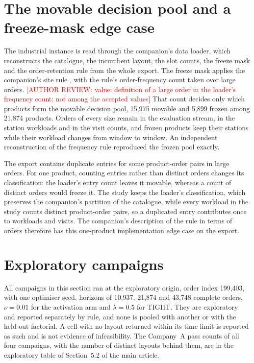 \documentclass[11pt]{article}
\newcommand{\authorreview}[1]{\textcolor{red}{[AUTHOR REVIEW: #1]}}
\begin{document}
\section{The movable decision pool and a freeze-mask edge case}\label{sec:s-freeze}
The industrial instance is read through the companion's data loader, which reconstructs the catalogue, the incumbent layout, the slot counts, the freeze mask and the order-retention rule from the whole export. The freeze mask applies the companion's site rule \citep[Supplementary Section S6]{belul_companion}, with the rule's order-frequency count taken over large orders. \authorreview{value: definition of a large order in the loader's frequency count; not among the accepted values} That count decides only which products form the movable decision pool, 15,975 movable and 5,899 frozen among 21,874 products. Orders of every size remain in the evaluation stream, in the station workloads and in the visit counts, and frozen products keep their stations while their workload changes from window to window. An independent reconstruction of the frequency rule reproduced the frozen pool exactly.

The export contains duplicate entries for some product-order pairs in large orders. For one product, counting entries rather than distinct orders changes its classification: the loader's entry count leaves it movable, whereas a count of distinct orders would freeze it. The study keeps the loader's classification, which preserves the companion's partition of the catalogue, while every workload in the study counts distinct product-order pairs, so a duplicated entry contributes once to workloads and visits. The companion's description of the rule in terms of orders therefore has this one-product implementation edge case on the export.

\section{Exploratory campaigns}\label{sec:s-exploratory}
All campaigns in this section ran at the exploratory origin, order index 199,403, with one optimiser seed, horizons of 10,937, 21,874 and 43,748 complete orders, $\nu=0.01$ for the activation arm and $\lambda=0.5$ for TIGHT. They are exploratory and reported separately by rule, and none is pooled with another or with the held-out factorial. A cell with no layout returned within its time limit is reported as such and is not evidence of infeasibility. The Company~A pass counts of all four campaigns, with the number of distinct layouts behind them, are in the exploratory table of Section~5.2 of the main article.
\end{document}
